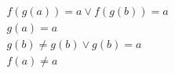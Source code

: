 \begin{align*}
%
& f(g(a)) = a \lor f(g(b)) = a
~\\~
& g(a) = a
~\\~
& g(b)  \neq  g(b) \lor g(b) = a
~\\~
& f(a)  \neq  a
%
\end{align*}

